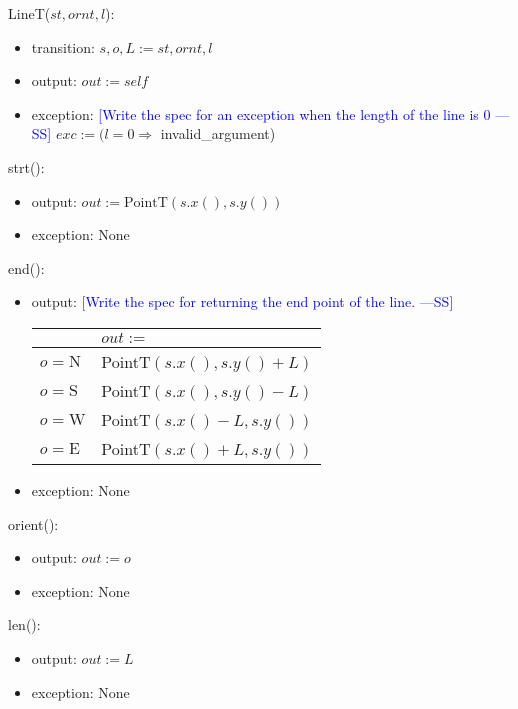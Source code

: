 \documentclass[12pt]{article}
\newcommand{\authornote}[3]{\textcolor{#1}{[#3 ---#2]}}
\newcommand{\authornote}[3]{}
\newcommand{\wss}[1]{\authornote{blue}{SS}{#1}}
\begin{document}
LineT($st, ornt, l$):
\begin{itemize}
\item transition: $s, o, L := st, ornt, l$
\item output: $out := \mathit{self}$
\item exception: \wss{Write the spec for an exception when the length of the line is 0}  $exc := (l = 0 \Rightarrow$ invalid\_argument)
\end{itemize}

\noindent strt():
\begin{itemize}
\item output: $out := \mbox{PointT}(s.x(), s.y())$
\item exception: None
\end{itemize}

\noindent end():
\begin{itemize}
\item output: \wss{Write the spec for returning the end point of the
    line.}  
    \\
\begin{tabular}{|l|l|}
\hline
 & $out:=$  \\
\hline
$o = \mbox{N}$ & PointT$(s.x(), s.y()+L)$  \\
\hline
$o = \mbox{S}$ & PointT$(s.x(), s.y()-L)$ \\
\hline
$o = \mbox{W}$ & PointT$(s.x()-L, s.y())$\\
\hline
$o = \mbox{E}$ & PointT$(s.x()+L, s.y())$ \\
\hline
\end{tabular}

\item exception: None
\end{itemize}

\noindent orient():
\begin{itemize}
\item output: $out := o$
\item exception: None
\end{itemize}

\noindent len():
\begin{itemize}
\item output: $out := L$
\item exception: None
\end{itemize}
\end{document}
